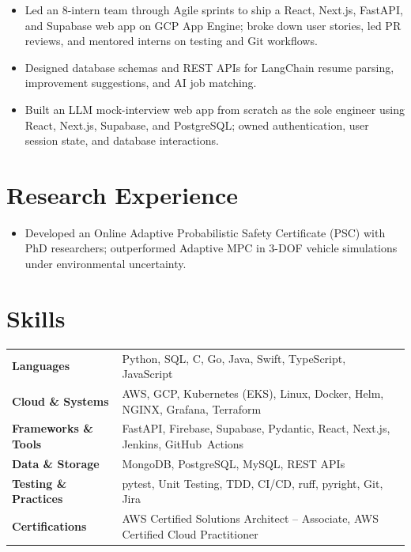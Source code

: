\documentclass[11pt, letterpaper]{article}
\begin{document}
\begin{itemize}
  \item Led an 8-intern team through Agile sprints to ship a React, Next.js, FastAPI, and Supabase web app on GCP App Engine; broke down user stories, led PR reviews, and mentored interns on testing and Git workflows.
  \item Designed database schemas and REST APIs for LangChain resume parsing, improvement suggestions, and AI job matching.
\end{itemize}

\begin{itemize}
  \item Built an LLM mock-interview web app from scratch as the sole engineer using React, Next.js, Supabase, and PostgreSQL; owned authentication, user session state, and database interactions.
\end{itemize}

\section{Research Experience}
\begin{itemize}
  \item Developed an Online Adaptive Probabilistic Safety Certificate (PSC) with PhD researchers; outperformed Adaptive MPC in 3-DOF vehicle simulations under environmental uncertainty.
\end{itemize}

\section{Skills}
\begin{tabularx}{\textwidth}{@{}l @{\hspace{7pt}} >{\raggedright\arraybackslash}X@{}}
  \textbf{Languages} & Python, SQL, C, Go, Java, Swift, TypeScript, JavaScript \\[1pt]
  \textbf{Cloud \& Systems} & AWS, GCP, Kubernetes (EKS), Linux, Docker, Helm, NGINX, Grafana, Terraform \\[1pt]
  \textbf{Frameworks \& Tools} & FastAPI, Firebase, Supabase, Pydantic, React, Next.js, Jenkins, GitHub~Actions \\[1pt]
  \textbf{Data \& Storage} & MongoDB, PostgreSQL, MySQL, REST APIs \\[1pt]
  \textbf{Testing \& Practices} & pytest, Unit Testing, TDD, CI/CD, ruff, pyright, Git, Jira \\[1pt]
  \textbf{Certifications} & AWS Certified Solutions Architect -- Associate, AWS Certified Cloud Practitioner \\
\end{tabularx}
\end{document}
